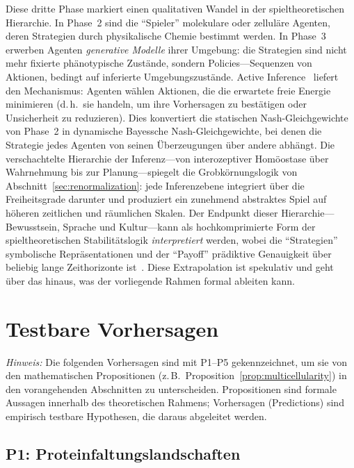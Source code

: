 \documentclass[12pt,a4paper]{article}
\theoremstyle{remark}
\begin{document}
Diese dritte Phase markiert einen qualitativen Wandel in der spieltheoretischen Hierarchie. In Phase~2 sind die ``Spieler'' molekulare oder zelluläre Agenten, deren Strategien durch physikalische Chemie bestimmt werden. In Phase~3 erwerben Agenten \emph{generative Modelle} ihrer Umgebung: die Strategien sind nicht mehr fixierte phänotypische Zustände, sondern Policies---Sequenzen von Aktionen, bedingt auf inferierte Umgebungszustände. Active Inference~\citep{FristonFreeEnergy} liefert den Mechanismus: Agenten wählen Aktionen, die die erwartete freie Energie minimieren (d.\,h.\ sie handeln, um ihre Vorhersagen zu bestätigen oder Unsicherheit zu reduzieren). Dies konvertiert die statischen Nash-Gleichgewichte von Phase~2 in dynamische Bayessche Nash-Gleichgewichte, bei denen die Strategie jedes Agenten von seinen Überzeugungen über andere abhängt. Die verschachtelte Hierarchie der Inferenz---von interozeptiver Homöostase über Wahrnehmung bis zur Planung---spiegelt die Grobkörnungslogik von Abschnitt~\ref{sec:renormalization}: jede Inferenzebene integriert über die Freiheitsgrade darunter und produziert ein zunehmend abstraktes Spiel auf höheren zeitlichen und räumlichen Skalen. Der Endpunkt dieser Hierarchie---Bewusstsein, Sprache und Kultur---kann als hochkomprimierte Form der spieltheoretischen Stabilitätslogik \emph{interpretiert} werden, wobei die ``Strategien'' symbolische Repräsentationen und der ``Payoff'' prädiktive Genauigkeit über beliebig lange Zeithorizonte ist~\citep{FristonPDF}. Diese Extrapolation ist spekulativ und geht über das hinaus, was der vorliegende Rahmen formal ableiten kann.

\section{Testbare Vorhersagen}
\label{sec:predictions}

\noindent\textit{Hinweis:} Die folgenden Vorhersagen sind mit P1--P5 gekennzeichnet, um sie von den mathematischen Propositionen (z.\,B.\ Proposition~\ref{prop:multicellularity}) in den vorangehenden Abschnitten zu unterscheiden. Propositionen sind formale Aussagen innerhalb des theoretischen Rahmens; Vorhersagen (Predictions) sind empirisch testbare Hypothesen, die daraus abgeleitet werden.

\subsection{P1: Proteinfaltungslandschaften}
\end{document}
